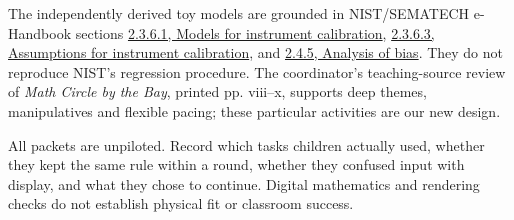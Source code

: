 \documentclass[letterpaper,11pt]{article}
\begin{document}
The independently derived toy models are grounded in NIST/SEMATECH e-Handbook sections \href{https://www.itl.nist.gov/div898/handbook/mpc/section3/mpc361.htm}{2.3.6.1, Models for instrument calibration}, \href{https://www.itl.nist.gov/div898/handbook/mpc/section3/mpc363.htm}{2.3.6.3, Assumptions for instrument calibration}, and \href{https://www.itl.nist.gov/div898/handbook/mpc/section4/mpc45.htm}{2.4.5, Analysis of bias}. They do not reproduce NIST's regression procedure. The coordinator's teaching-source review of \emph{Math Circle by the Bay}, printed pp. viii--x, supports deep themes, manipulatives and flexible pacing; these particular activities are our new design.

All packets are unpiloted. Record which tasks children actually used, whether they kept the same rule within a round, whether they confused input with display, and what they chose to continue. Digital mathematics and rendering checks do not establish physical fit or classroom success.
\end{document}
